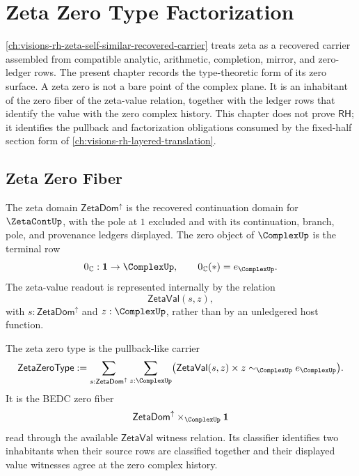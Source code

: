 \chapter{Zeta Zero Type Factorization}
\label{ch:visions-rh-zeta-zero-type-factorization}

\autoref{ch:visions-rh-zeta-self-similar-recovered-carrier} treats zeta as
a recovered carrier assembled from compatible analytic, arithmetic,
completion, mirror, and zero-ledger rows. The present chapter records the
type-theoretic form of its zero surface. A zeta zero is not a bare point of
the complex plane. It is an inhabitant of the zero fiber of the zeta-value
relation, together with the ledger rows that identify the value with the
zero complex history. This chapter does not prove $\mathsf{RH}$; it
identifies the pullback and factorization obligations consumed by the
fixed-half section form of \autoref{ch:visions-rh-layered-translation}.

\section{Zeta Zero Fiber}
\label{sec:rh-zeta-zero-type-fiber}

\begin{definition}
\label{def:rh-zeta-zero-type-domain-zero-object}
The zeta domain $\mathsf{ZetaDom}^{\uparrow}$ is the recovered
continuation domain for $\ZetaContUp$, with the pole at $1$ excluded and
with its continuation, branch, pole, and provenance ledgers displayed. The
zero object of $\ComplexUp$ is the terminal row
$$
0_{\mathbb C}:\mathbf 1\to\ComplexUp,
\qquad
0_{\mathbb C}(*)=e_{\ComplexUp}.
$$
The zeta-value readout is represented internally by the relation
$$
\mathsf{ZetaVal}(s,z),
$$
with $s:\mathsf{ZetaDom}^{\uparrow}$ and $z:\ComplexUp$, rather than by an
unledgered host function.
\end{definition}

\begin{definition}
\label{def:rh-zeta-zero-type}
The zeta zero type is the pullback-like carrier
$$
\mathsf{ZetaZeroType}
:=
\sum_{s:\mathsf{ZetaDom}^{\uparrow}}
\sum_{z:\ComplexUp}
\bigl(
\mathsf{ZetaVal}(s,z)
\times
z\sim_{\ComplexUp}e_{\ComplexUp}
\bigr).
$$
It is the BEDC zero fiber
$$
\mathsf{ZetaDom}^{\uparrow}
\times_{\ComplexUp}
\mathbf 1
$$
read through the available $\mathsf{ZetaVal}$ witness relation. Its
classifier identifies two inhabitants when their source rows are classified
together and their displayed value witnesses agree at the zero complex
history.
\end{definition}

